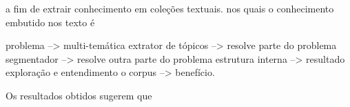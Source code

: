 a fim de extrair conhecimento em coleções textuais.  
nos quais o conhecimento embutido nos texto é 




problema --> multi-temática
extrator de tópicos --> resolve parte do problema
segmentador --> resolve outra parte do problema
estrutura interna --> resultado
exploração e entendimento o corpus --> benefício.


Os resultados obtidos sugerem que 
























